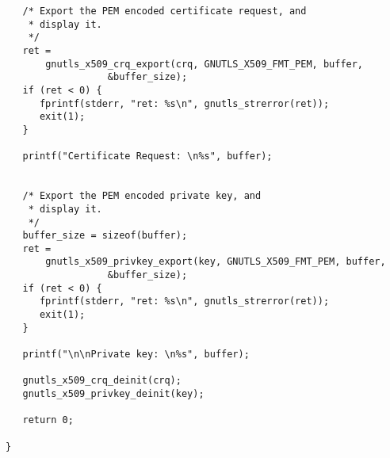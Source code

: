 \begin{verbatim}
   /* Export the PEM encoded certificate request, and
    * display it.
    */
   ret =
       gnutls_x509_crq_export(crq, GNUTLS_X509_FMT_PEM, buffer,
			      &buffer_size);
   if (ret < 0) {
      fprintf(stderr, "ret: %s\n", gnutls_strerror(ret));
      exit(1);
   }

   printf("Certificate Request: \n%s", buffer);


   /* Export the PEM encoded private key, and
    * display it.
    */
   buffer_size = sizeof(buffer);
   ret =
       gnutls_x509_privkey_export(key, GNUTLS_X509_FMT_PEM, buffer,
				  &buffer_size);
   if (ret < 0) {
      fprintf(stderr, "ret: %s\n", gnutls_strerror(ret));
      exit(1);
   }

   printf("\n\nPrivate key: \n%s", buffer);

   gnutls_x509_crq_deinit(crq);
   gnutls_x509_privkey_deinit(key);

   return 0;

}

\end{verbatim}
